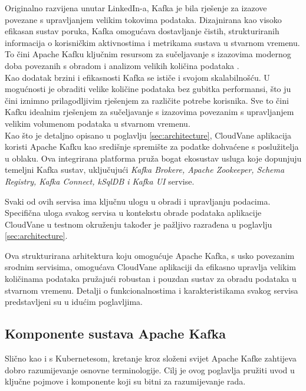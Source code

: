 \documentclass[times, utf8, diplomski]{fer}
\begin{document}
Originalno razvijena unutar LinkedIn-a, Kafka je bila rješenje za izazove povezane s upravljanjem velikim tokovima podataka. Dizajnirana kao visoko efikasan sustav poruka, Kafka omogućava dostavljanje čistih, strukturiranih informacija o korisničkim aktivnostima i metrikama sustava u stvarnom vremenu. To čini Apache Kafku ključnim resursom za sučeljavanje s izazovima modernog doba povezanih s obradom i analizom velikih količina podataka \citep{shapira_kafka_2021}.\\

Kao dodatak brzini i efikasnosti Kafka se ističe i svojom skalabilnošću. U mogućnosti je obraditi velike količine podataka bez gubitka performansi, što ju čini iznimno prilagodljivim rješenjem za različite potrebe korisnika. Sve to čini Kafku idealnim rješenjem za sučeljavanje s izazovima povezanim s upravljanjem velikim volumenom podataka u stvarnom vremenu. \\

Kao što je detaljno opisano u poglavlju \ref{sec:architecture}, CloudVane aplikacija koristi Apache Kafku kao središnje spremište za podatke dohvaćene s poslužitelja u oblaku. Ova integrirana platforma pruža bogat ekosustav usluga koje dopunjuju temeljni Kafka sustav, uključujući \emph{Kafka Brokere, Apache Zookeeper, Schema Registry, Kafka Connect, kSqlDB i Kafka UI} servise.

Svaki od ovih servisa ima ključnu ulogu u obradi i upravljanju podacima. Specifična uloga svakog servisa u kontekstu obrade podataka aplikacije CloudVane u testnom okruženju također je pažljivo razrađena u poglavlju \ref{sec:architecture}.

Ova strukturirana arhitektura koju omogućuje Apache Kafka, s usko povezanim srodnim servisima, omogućava CloudVane aplikaciji da efikasno upravlja velikim količinama podataka pružajući robustan i pouzdan sustav za obradu podataka u stvarnom vremenu.
Detalji o funkcionalnostima i karakteristikama svakog servisa predstavljeni su u idućim poglavljima.

\subsection{Komponente sustava Apache Kafka}

Slično kao i s Kubernetesom, kretanje kroz složeni svijet Apache Kafke zahtijeva dobro razumijevanje osnovne terminologije. Cilj je ovog poglavlja pružiti uvod u ključne pojmove i komponente koji su bitni za razumijevanje rada.\\
\end{document}
